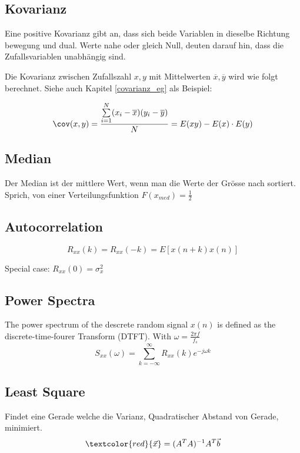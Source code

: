 \subsection{Kovarianz}
Eine positive Kovarianz gibt an, dass sich beide Variablen in dieselbe Richtung bewegung und dual. Werte nahe oder gleich Null, deuten darauf hin, dass die Zufallsvariablen unabhängig sind.

Die Kovarianz zwischen Zufallszahl $x,y$ mit Mittelwerten $\overline{x}, \overline{y}$ wird wie folgt berechnet. Siehe auch Kapitel \ref{covarianz_eg} als Beispiel:

\[
\cov(x,y) = \frac{\sum\limits_{i=1}^{N}(x_i - \overline{x})(y_i - \overline{y})}{N} = E(xy) - E(x)\cdot E(y)
\]

\subsection{Median}
Der Median ist der mittlere Wert, wenn man die Werte der Grösse nach sortiert. Sprich, von einer Verteilungsfunktion $F(x_{med}) = \frac{1}{2}$


\subsection{Autocorrelation}
\[
R_{xx}(k) = R_{xx}(-k)=E[x(n+k)x(n)]
\]

Special case: $R_{xx}(0) = \sigma_x^2$

\subsection{Power Spectra}
The power spectrum of the descrete random signal $x(n)$ is defined as the discrete-time-fourer Transform (DTFT). With $\omega = \frac{2\pi f }{f_s}$
\[
S_{xx}(\omega) = \sum_{k=-\infty}^{\infty}R_{xx}(k)e^{-j\omega k}
\]


\subsection{Least Square}
Findet eine Gerade welche die Varianz, Quadratischer Abstand von Gerade, minimiert. 
\[\textcolor{red}{\vec{x}} = (A^TA)^{-1}A^T\vec{b}\]